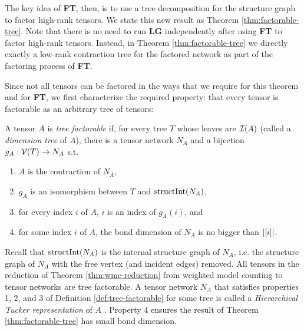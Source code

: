 The key idea of \textbf{FT}, then, is to use a tree decomposition for the structure graph to factor high-rank tensors.
We state this new result as Theorem \ref{thm:factorable-tree}.
{ \color{blue}
Note that there is no need to run \textbf{LG} independently after using \textbf{FT} to factor high-rank tensors.
Instead, in Theorem \ref{thm:factorable-tree} we directly exactly a low-rank contraction tree for the factored network as part of the factoring process of \textbf{FT}.
} %

Since not all tensors can be factored in the ways that we require for this theorem and for \textbf{FT}, we first characterize the required property: that every tensor is factorable as an arbitrary tree of tensors:



\begin{definition} \label{def:tree-factorable}
A tensor $A$ is \emph{tree factorable} if, for every tree $T$ whose leaves are $\mathcal{I}(A)$ (called a \emph{dimension tree} of $A$), there is a tensor network $N_A$ and a bijection $g_A: \mathcal{V}(T) \rightarrow N_A$ s.t.
\begin{enumerate}
\item $A$ is the contraction of $N_A$,
\item $g_A$ is an isomorphism between $T$ and $\text{structInt}(N_A)$,
\item for every index $i$ of $A$, $i$ is an index of $g_A(i)$, and
\item for some index $i$ of $A$, the bond dimension of $N_A$ is no bigger than $|[i]|$. %
\end{enumerate}
\end{definition}
Recall that $\text{structInt}(N_A)$ is the internal structure graph of $N_A$, i.e. the structure graph of $N_A$ with the free vertex (and incident edges) removed.
All tensors in the reduction of Theorem \ref{thm:wmc-reduction} from weighted model counting to tensor networks are tree factorable. A tensor network $N_A$ that satisfies properties 1, 2, and 3 of Definition \ref{def:tree-factorable} for some tree is called a \emph{Hierarchical Tucker representation} of $A$ \cite{Grasedyck10}. Property 4 ensures the result of Theorem \ref{thm:factorable-tree} has small bond dimension.

